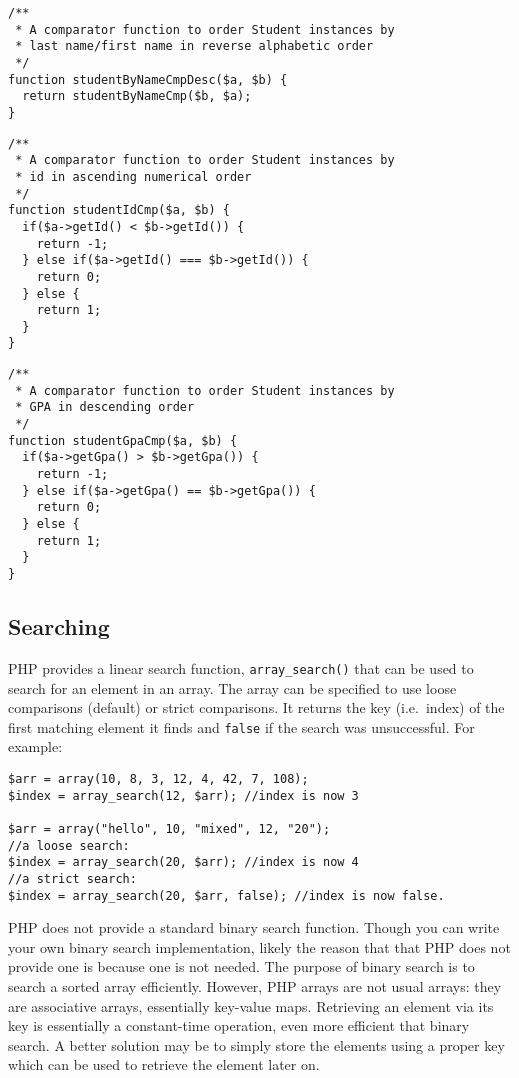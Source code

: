 \begin{verbatim}
/**
 * A comparator function to order Student instances by 
 * last name/first name in reverse alphabetic order
 */
function studentByNameCmpDesc($a, $b) {
  return studentByNameCmp($b, $a);
}
\end{verbatim}

\begin{verbatim}
/**
 * A comparator function to order Student instances by 
 * id in ascending numerical order
 */
function studentIdCmp($a, $b) {
  if($a->getId() < $b->getId()) {
    return -1;
  } else if($a->getId() === $b->getId()) {
    return 0;
  } else {
    return 1;
  }
}
\end{verbatim}

\begin{verbatim}
/**
 * A comparator function to order Student instances by 
 * GPA in descending order
 */
function studentGpaCmp($a, $b) {
  if($a->getGpa() > $b->getGpa()) {
    return -1;
  } else if($a->getGpa() == $b->getGpa()) {
    return 0;
  } else {
    return 1;
  }
}
\end{verbatim}

\subsection{Searching}

PHP provides a linear search function, \texttt{array_search()} that
can be used to search for an element in an array.  The array can be specified
to use loose comparisons (default) or strict comparisons.  It returns the
key (i.e.\ index) of the first matching element it finds and 
\texttt{false} if the search was unsuccessful.  For example:

\begin{verbatim}
$arr = array(10, 8, 3, 12, 4, 42, 7, 108);
$index = array_search(12, $arr); //index is now 3

$arr = array("hello", 10, "mixed", 12, "20");
//a loose search:
$index = array_search(20, $arr); //index is now 4
//a strict search:
$index = array_search(20, $arr, false); //index is now false.
\end{verbatim}

PHP does not provide a standard binary search function.  Though you can
write your own binary search implementation, likely the reason that that
PHP does not provide one is because one is not needed.  The purpose of
binary search is to search a sorted array efficiently.  However, PHP
arrays are not usual arrays: they are associative arrays, essentially
key-value maps.  Retrieving an element via its key is essentially a 
constant-time operation, even more efficient that binary search.  A better
solution may be to simply store the elements using a proper key which
can be used to retrieve the element later on.  

